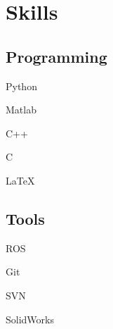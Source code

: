 \documentclass[letterpaper]{deedy-resume} %
\begin{document}
\hfill
%
%
\begin{minipage}[t]{0.33\textwidth} %









\section{Skills}

\subsection{Programming}


\vspace{\topsep} %
\begin{tightitemize}
\item Python
\item Matlab
\item C++
\item C
\item \LaTeX
\end{tightitemize}

\sectionspace

\subsection{Tools}

\vspace{\topsep} %
\begin{tightitemize}
\item ROS
\item Git
\item SVN
\item SolidWorks
\end{tightitemize}


\end{minipage}
\end{document}
